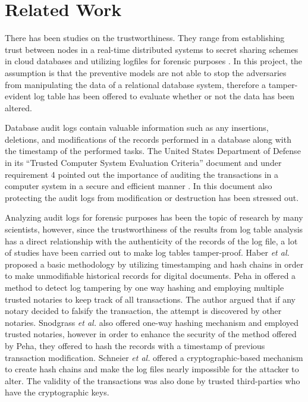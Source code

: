 \section{Related Work}

There has been studies on the trustworthiness. They range from
establishing trust between nodes in a real-time distributed systems
\cite{khayat2017trust} to secret sharing schemes in cloud databases
\cite{dutta2013privacy} and utilizing logfiles for forensic purposes
\cite{sinha2014continuous}. In this project, the assumption is that the
preventive models are not able to stop the adversaries from manipulating the
data of a relational database system, therefore a tamper-evident log table has
been offered to evaluate whether or not the data has been altered. 

        Database audit logs contain valuable information such as any insertions,
deletions, and modifications of the records performed in a database along with
the timestamp of the performed tasks. The United States Department of Defense in
its “Trusted Computer System Evaluation Criteria” document and under requirement
4 pointed out the importance of auditing the transactions in a computer system
in a secure and efficient manner \cite{USDoD1985}. In this document also
protecting the audit logs from modification or destruction has been stressed
out.

        Analyzing audit logs for forensic purposes has been the topic of
research by many scientists, however, since the trustworthiness of the results
from log table analysis has a direct relationship with the authenticity of the
records of the log file, a lot of studies have been carried out to make log
tables tamper-proof. Haber {\it et al.}\cite{haber1991how} proposed a basic
methodology by utilizing timestamping and hash chains in order to make
unmodifiable historical records for digital documents. Peha in
\cite{peha1999electronic} offered a method to detect log tampering by one way
hashing and employing multiple trusted notaries to keep track of all
transactions. The author argued that if any notary decided to falsify the
transaction, the attempt is discovered by other notaries. Snodgrass {\it et al.}
\cite{snodgrass2004Tamper} also offered one-way hashing mechanism and employed
trusted notaries, however in order to enhance the security of the method offered
by Peha, they offered to hash the records with a timestamp of previous
transaction modification. Schneier {\it et al.}\cite{schneier1998cryptoraphic}
offered a cryptographic-based mechanism to create hash chains and make the log
files nearly impossible for the attacker to alter. The validity of the
transactions was also done by trusted third-parties who have the cryptographic
keys.

